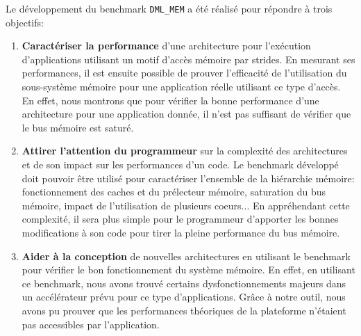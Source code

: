         Le développement du benchmark \verb=DML_MEM= a été réalisé pour répondre à trois objectifs:
        \begin{enumerate}
            \item \textbf{Caractériser la performance} d'une architecture pour l'exécution d'applications utilisant un motif d'accès mémoire par strides. En mesurant ses performances, il est ensuite possible de prouver l’efficacité de l’utilisation du sous-système mémoire pour une application réelle utilisant ce type d'accès. En effet, nous montrons que pour vérifier la bonne performance d'une architecture pour une application donnée, il n'est pas suffisant de vérifier que le bus mémoire est saturé.
            \item \textbf{Attirer l'attention du programmeur} sur la complexité des architectures et de son impact sur les performances d'un code. Le benchmark développé doit pouvoir être utilisé pour caractériser l'ensemble de la hiérarchie mémoire: fonctionnement des caches et du prélecteur mémoire, saturation du bus mémoire, impact de l'utilisation de plusieurs coeurs... En appréhendant cette complexité, il sera plus simple pour le programmeur d'apporter les bonnes modifications à son code pour tirer la pleine performance du bus mémoire.
            \item \textbf{Aider à la conception} de nouvelles architectures en utilisant le benchmark pour vérifier le bon fonctionnement du système mémoire. En effet, en utilisant ce benchmark, nous avons trouvé certains dysfonctionnements majeurs dans un accélérateur prévu pour ce type d'applications. Grâce à notre outil, nous avons pu prouver que les performances théoriques de la plateforme n'étaient pas accessibles par l'application. 
        \end{enumerate}

    
